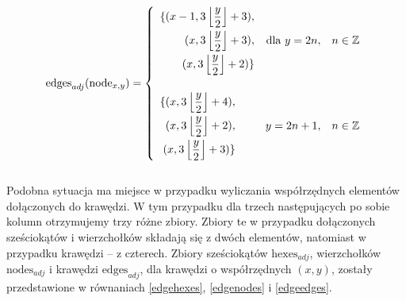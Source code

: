 \documentclass[a4paper,12pt]{article}
\begin{document}
\begin{equation}
  \text{edges}_{adj}(\text{node}_{x,y})=
  \left\{
    \begin{array}{l r l}
      \begin{aligned}
      \{
      (x-1, 3\left\lfloor\frac{y}{2}\right\rfloor+3), \\
      (x, 3\left\lfloor\frac{y}{2}\right\rfloor+3), \\
      (x, 3\left\lfloor\frac{y}{2}\right\rfloor+2)
      \}
      \end{aligned} & \mbox{dla } y=2n, & n\in\mathbb{Z} \\[40pt]
      \begin{aligned}
      \{
      (x, 3\left\lfloor\frac{y}{2}\right\rfloor+4), \\
      (x, 3\left\lfloor\frac{y}{2}\right\rfloor+2), \\
      (x, 3\left\lfloor\frac{y}{2}\right\rfloor+3)
      \}
      \end{aligned} & y=2n+1, & n\in\mathbb{Z} \\
    \end{array} \right.
  \label{nodeedges}
\end{equation} \\

Podobna sytuacja ma miejsce w przypadku wyliczania współrzędnych
elementów dołączonych do krawędzi. W tym przypadku dla trzech
następujących po sobie kolumn otrzymujemy trzy różne zbiory. Zbiory te
w przypadku dołączonych sześciokątów i wierzchołków składają się z
dwóch elementów, natomiast w przypadku krawędzi -- z czterech. Zbiory
sześciokątów $\text{hexes}_{adj}$, wierzchołków $\text{nodes}_{adj}$ i
krawędzi $\text{edges}_{adj}$, dla krawędzi o współrzędnych $(x,y)$,
zostały przedstawione w równaniach \ref{edgehexes}, \ref{edgenodes} i
\ref{edgeedges}.
\end{document}

